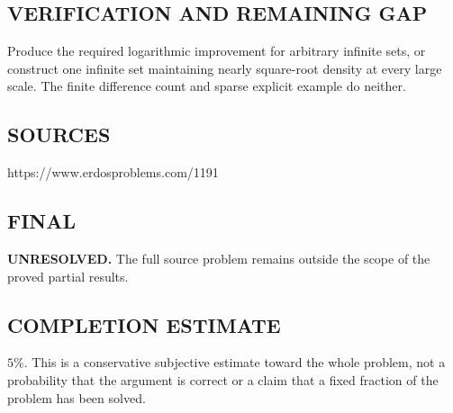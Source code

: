 \subsection*{VERIFICATION AND REMAINING GAP}
Produce the required logarithmic improvement for arbitrary infinite sets,
or construct one infinite set maintaining nearly square-root density at every
large scale. The finite difference count and sparse explicit example do neither.

\subsection*{SOURCES}
https://www.erdosproblems.com/1191

\subsection*{FINAL}
\textbf{UNRESOLVED.} The full source problem remains outside the scope of the proved partial results.

\subsection*{COMPLETION ESTIMATE}
$5\%$. This is a conservative subjective estimate toward the whole problem, not a probability that the argument is correct or a claim that a fixed fraction of the problem has been solved.
